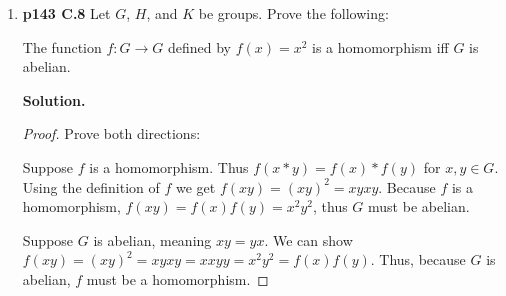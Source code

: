 \documentclass[11pt]{article}
\begin{document}
\begin{enumerate}
\item {\bfseries p143 C.8} Let $G$, $H$, and $K$ be groups. Prove the following:
 
	The function $f : G \rightarrow G$ defined by $f(x) = x^2$ is a homomorphism iff $G$ is abelian.
  
	{\bfseries Solution.}
	
	\begin{proof}
	Prove both directions:
	
	Suppose $f$ is a homomorphism. Thus $f(x*y) = f(x)*f(y)$ for $x, y \in G$. Using the definition of $f$ we get $f(xy) = (xy)^2 = xyxy$. Because $f$ is a homomorphism, $f(xy) = f(x)f(y) = x^2y^2$, thus $G$ must be abelian.
	
	Suppose $G$ is abelian, meaning $xy = yx$. We can show $f(xy) = (xy)^2 = xyxy = xxyy = x^2y^2 = f(x)f(y)$. Thus, because $G$ is abelian, $f$ must be a homomorphism.
	\end{proof}

\end{enumerate}
\end{document}
